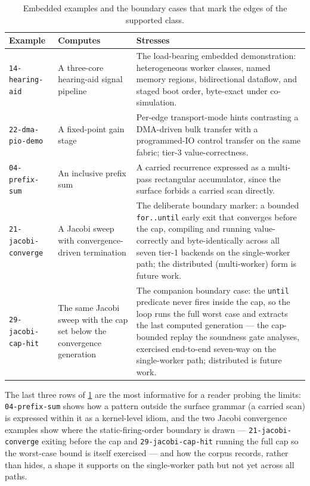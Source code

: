 \begin{table}[htbp]
  \centering
  \small
  \begin{tabular}{@{}p{}p{}p{}@{}}
    \toprule
    Example & Computes & Stresses \\
    \midrule
    \texttt{14-hearing-aid} & A three-core hearing-aid signal pipeline & The
      load-bearing embedded demonstration: heterogeneous worker classes, named memory
      regions, bidirectional dataflow, and staged boot order, byte-exact under
      co-simulation. \\
    \texttt{22-dma-pio-demo} & A fixed-point gain stage & Per-edge transport-mode
      hints contrasting a DMA-driven bulk transfer with a programmed-IO control
      transfer on the same fabric; tier-3 value-correctness. \\
    \texttt{04-prefix-sum} & An inclusive prefix sum & A carried recurrence expressed
      as a multi-pass rectangular accumulator, since the surface forbids a carried
      scan directly. \\
    \texttt{21-jacobi-converge} & A Jacobi sweep with convergence-driven termination &
      The deliberate boundary marker: a bounded \texttt{for..until} early exit that
      converges before the cap, compiling and running value-correctly and byte-identically
      across all seven tier-1 backends on the single-worker path; the distributed
      (multi-worker) form is future work. \\
    \texttt{29-jacobi-cap-hit} & The same Jacobi sweep with the cap set below the
      convergence generation & The companion boundary case: the \texttt{until} predicate
      never fires inside the cap, so the loop runs the full worst case and extracts the
      last computed generation --- the cap-bounded replay the soundness gate analyses,
      exercised end-to-end seven-way on the single-worker path; distributed is future work. \\
    \bottomrule
  \end{tabular}
  \caption{Embedded examples and the boundary cases that mark the edges of the
  supported class.}
  \label{tab:examples-boundary}
\end{table}

The last three rows of \cref{tab:examples-boundary} are the most informative for a
reader probing the limits: \texttt{04-prefix-sum} shows how a pattern outside the
surface grammar (a carried scan) is expressed within it as a kernel-level idiom, and
the two Jacobi convergence examples show where the static-firing-order boundary is
drawn --- \texttt{21-jacobi-converge} exiting before the cap and
\texttt{29-jacobi-cap-hit} running the full cap so the worst-case bound is itself
exercised --- and how the corpus records, rather than hides, a shape it supports on
the single-worker path but not yet across all paths.
